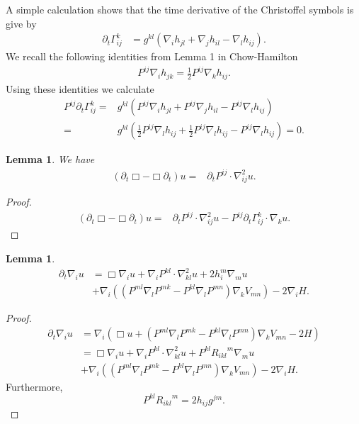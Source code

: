 \documentclass{amsart}
\newtheorem{lemma}[theorem]{Lemma}
\theoremstyle{definition}
\theoremstyle{remark}
\numberwithin{equation}{section}
\begin{document}
A simple calculation shows that the time derivative of the Christoffel symbols is give by
\begin{align}
\partial_t \Gamma_{ij}^k&=g^{kl}\left(\nabla_ih_{jl}+\nabla_jh_{il}-\nabla_{l}h_{ij}\right).
\end{align}
We recall the following identities from Lemma 1 in Chow-Hamilton
\begin{align}
P^{ij}\nabla_ih_{jk}=\frac{1}{2}P^{ij}\nabla_kh_{ij}.
\end{align}
Using these identities we calculate
\begin{align*}
P^{ij}\partial_t \Gamma_{ij}^k=&g^{kl}\left(P^{ij}\nabla_ih_{jl}+P^{ij}\nabla_jh_{il}-P^{ij}\nabla_{l}h_{ij}\right)\\
=&g^{kl}\left(\frac{1}{2}P^{ij}\nabla_lh_{ij}+\frac{1}{2}P^{ij}\nabla_lh_{ij}-P^{ij}\nabla_{l}h_{ij}\right)=0.
\end{align*}
\begin{lemma}
 We have
\begin{align}
(\partial_t \Box-\Box\partial_t) u=&\partial_tP^{ij}\cdot\nabla^2_{ij}u.
\end{align}
\end{lemma}
\begin{proof}
\begin{align*}
(\partial_t \Box-\Box \partial_t)u
=&\partial_tP^{ij}\cdot\nabla^2_{ij}u-P^{ij}\partial_t\Gamma_{ij}^k\cdot\nabla_ku.
\end{align*}
\end{proof}
\begin{lemma}
\begin{align}
\partial_t\nabla_iu&=\Box\nabla_i u+\nabla_iP^{kl}\cdot \nabla_{kl}^2u+2h_i^m\nabla_mu\\
&+\nabla_i\left(\left(P^{ml}\nabla_lP^{mk}-P^{kl}\nabla_l P^{mn}\right)\nabla_kV_{mn}\right)-2\nabla_iH.\nonumber
\end{align}
\end{lemma}
\begin{proof}
\begin{align*}
\partial_t\nabla_iu&=\nabla_i(\Box u+\left(P^{ml}\nabla_lP^{mk}-P^{kl}\nabla_l P^{mn}\right)\nabla_kV_{mn}-2H)\\
&=\Box\nabla_i u+\nabla_iP^{kl}\cdot \nabla_{kl}^2u+P^{kl}{R_{ikl}}^m\nabla_mu\\
&+\nabla_i\left(\left(P^{ml}\nabla_lP^{mk}-P^{kl}\nabla_l P^{mn}\right)\nabla_kV_{mn}\right)-2\nabla_iH.
\end{align*}
Furthermore,
\[P^{kl}{R_{ikl}}^m=2h_{ij}g^{jm}.\]
\end{proof}
\end{document}
